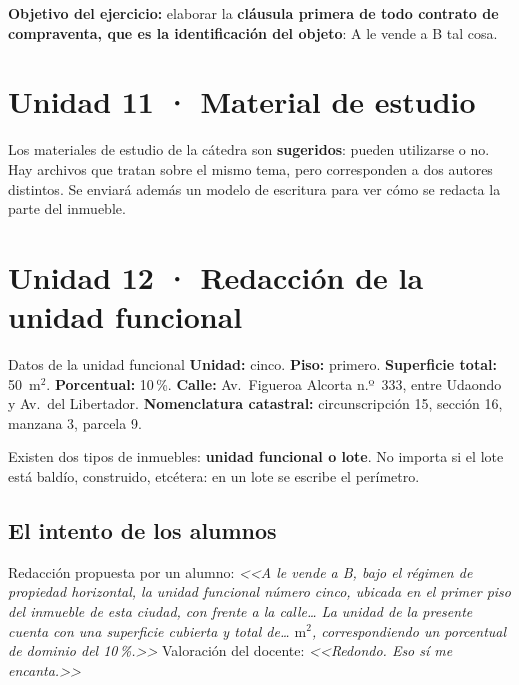 \documentclass[12pt,oneside]{book}
\newcommand{\mcuad}{$\mathrm{m}^2$}
\begin{document}
\begin{important}
\textbf{Objetivo del ejercicio:} elaborar la \textbf{cláusula primera de todo contrato de compraventa, que es la identificación del objeto}: A le vende a B tal cosa.
\end{important}

\section{Unidad 11 · Material de estudio}

Los materiales de estudio de la cátedra son \textbf{sugeridos}: pueden utilizarse o no. Hay archivos que tratan sobre el mismo tema, pero corresponden a dos autores distintos. Se enviará además un modelo de escritura para ver cómo se redacta la parte del inmueble.

\section{Unidad 12 · Redacción de la unidad funcional}

\begin{exercise}{Datos de la unidad funcional}
\textbf{Unidad:} cinco. \textbf{Piso:} primero. \textbf{Superficie total:} 50~\mcuad. \textbf{Porcentual:} 10\,\%. \textbf{Calle:} Av.\ Figueroa Alcorta n.º~333, entre Udaondo y Av.\ del Libertador. \textbf{Nomenclatura catastral:} circunscripción 15, sección 16, manzana 3, parcela 9.
\end{exercise}

Existen dos tipos de inmuebles: \textbf{unidad funcional o lote}. No importa si el lote está baldío, construido, etcétera: en un lote se escribe el perímetro.

\subsection{El intento de los alumnos}

\begin{note}
Redacción propuesta por un alumno: \textit{<<A le vende a B, bajo el régimen de propiedad horizontal, la unidad funcional número cinco, ubicada en el primer piso del inmueble de esta ciudad, con frente a la calle\ldots{} La unidad de la presente cuenta con una superficie cubierta y total de\ldots{} \mcuad, correspondiendo un porcentual de dominio del 10\,\%.>>} Valoración del docente: \textit{<<Redondo. Eso sí me encanta.>>}
\end{note}
\end{document}

